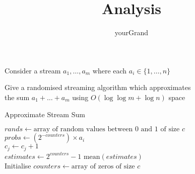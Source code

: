 \documentclass[12pt]{article}
\newenvironment{problem}[2][Problem]{\begin{trivlist}
\item[\hskip \labelsep {\bfseries #1}\hskip \labelsep {\bfseries #2.}]}{\end{trivlist}}
\begin{document}
 
 
\title{Analysis}
\author{yourGrand}
\maketitle

Consider a stream $a_1, \dots, a_m$ where each $a_i \in \{1, \dots, n\}$

\begin{problem}{1}
    Give a randomised streaming algorithm which approximates\\ the sum $a_1 + \dots + a_m$ using $O(\log{\log{m}} + \log{n})$ space\\

    \begin{algorithm}
        \caption{Approximate Stream Sum}
        \begin{algorithmic}[1]
             
                \State $rands \gets \text{array of random values between } 0 \text{ and } 1 \text{ of size } c$
                \State $probs \gets (2^{-counters}) \times a_i$ \\
                        \State $c_j \gets c_j + 1$
                    \EndIf
                \EndFor
            \EndProcedure\\
            
             
                \State $estimates \gets 2^{counters} - 1$ 
                \State \Return $\text{mean}(estimates)$
            \EndFunction\\
            
                \State Initialise $counters \gets \text{array of zeros of size } c$\\
                    \State {}
                \EndFor\\
                \State \Return {}
            \EndFunction
        \end{algorithmic}
    \end{algorithm}


\end{problem}
\end{document}
